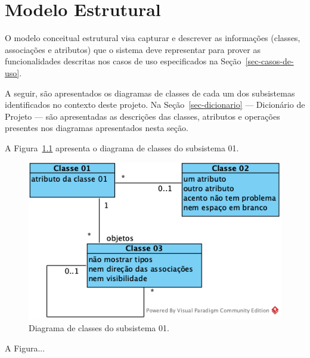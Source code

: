 \chapter{Modelo Estrutural}
\label{sec-modelo-estrutural}

O modelo conceitual estrutural visa capturar e descrever as informações (classes, associações e atributos) que o sistema deve representar para prover as funcionalidades descritas nos casos de uso especificados na Seção~\ref{sec-casos-de-uso}. 

A seguir, são apresentados os diagramas de classes de cada um dos subsistemas identificados no contexto deste projeto. Na Seção~\ref{sec-dicionario} --- Dicionário de Projeto --- são apresentadas as descrições das classes, atributos e operações presentes nos diagramas apresentados nesta seção.


A Figura~\ref{fig-modelo-estrutural-subsistema-01} apresenta o diagrama de classes do subsistema 01.

\begin{figure}[h!]
	\centering
	\includegraphics[width=.7\textwidth]{figuras/fig-modelo-estrutural-subsistema-01.png}
	\caption{Diagrama de classes do subsistema 01.}
	\label{fig-modelo-estrutural-subsistema-01}
\end{figure} 


A Figura...
